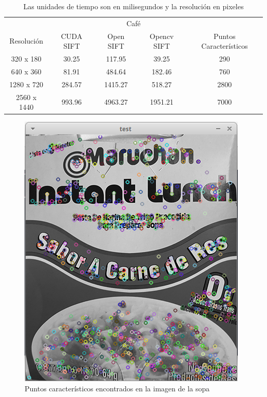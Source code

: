\begin{table}[phtb]
\centering
\begin{tabular}{|c|c|c|c|c|}
\hline

\multicolumn{5}{|c|}{Café} \\
\cline{1-5}
Resolución & CUDA SIFT & Open SIFT & Opencv SIFT & Puntos Característicos\\
\hline \hline
 320 x 180  & 30.25  &  117.95  & 39.25   & 290\\ \cline{1-5}
 640 x 360  & 81.91  &  484.64  & 182.46  & 760\\ \cline{1-5}
1280 x 720  & 284.57 &  1415.27 & 518.27  & 2800\\ \cline{1-5}
2560 x 1440 & 993.96 &  4963.27 & 1951.21 & 7000\\ \cline{1-5}

\end{tabular}
\caption{Las unidades de tiempo son en milisegundos y la resolución en pixeles}
\label{tabla:final}
\end{table}

\begin{figure}[ph]
			\centering
				\includegraphics[scale=1]{img/sopa.png}
			\caption{Puntos característicos encontrados en la imagen de la sopa}
\end{figure}

